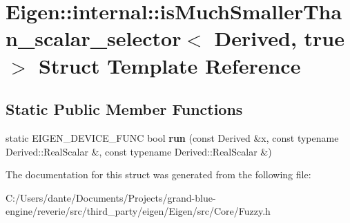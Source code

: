 \hypertarget{struct_eigen_1_1internal_1_1is_much_smaller_than__scalar__selector_3_01_derived_00_01true_01_4}{}\section{Eigen\+::internal\+::is\+Much\+Smaller\+Than\+\_\+scalar\+\_\+selector$<$ Derived, true $>$ Struct Template Reference}
\label{struct_eigen_1_1internal_1_1is_much_smaller_than__scalar__selector_3_01_derived_00_01true_01_4}
\subsection*{Static Public Member Functions}
\begin{DoxyCompactItemize}
\item 
\mbox{\label{struct_eigen_1_1internal_1_1is_much_smaller_than__scalar__selector_3_01_derived_00_01true_01_4_ac498f1f78aa18e7cd5592179354c8406}} 
static E\+I\+G\+E\+N\+\_\+\+D\+E\+V\+I\+C\+E\+\_\+\+F\+U\+NC bool {\bfseries run} (const Derived \&x, const typename Derived\+::\+Real\+Scalar \&, const typename Derived\+::\+Real\+Scalar \&)
\end{DoxyCompactItemize}


The documentation for this struct was generated from the following file\+:\begin{DoxyCompactItemize}
\item 
C\+:/\+Users/dante/\+Documents/\+Projects/grand-\/blue-\/engine/reverie/src/third\+\_\+party/eigen/\+Eigen/src/\+Core/Fuzzy.\+h\end{DoxyCompactItemize}
